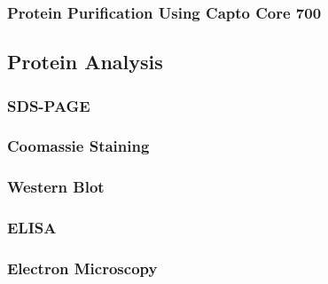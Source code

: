 \subsubsection{Protein Purification Using Capto Core 700}

\subsection{Protein Analysis}
\subsubsection{SDS-PAGE}
\subsubsection{Coomassie Staining}
\subsubsection{Western Blot}
\subsubsection{ELISA}
\subsubsection{Electron Microscopy}